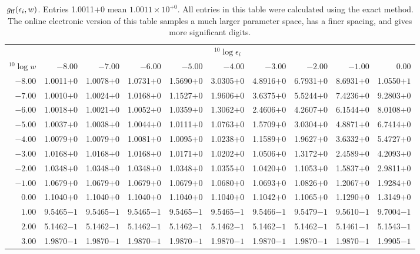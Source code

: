 \documentclass[useAMS,usenatbib]{mn2e}
\begin{document}
\begin{table}
\caption{$g_{\rm ff}(\epsilon_i,w)$. Entries 1.0011$+0$ mean $1.0011 \times
  10^{+0}$. All entries in this table were calculated using the exact method.
  The online electronic version of this table samples a much larger parameter
  space, has a finer spacing, and gives more significant digits.\label{nonav}}
\begin{tabular}{rrrrrrrrrr}
\hline
   & \multicolumn{9}{c}{${}^{10}\log \epsilon_i$} \\
${}^{10}\log w$ & $-8.00$ & $-7.00$ &   $-6.00$ &    $-5.00$ &    $-4.00$ &    $-3.00$ &    $-2.00$ &    $-1.00$ &       0.00 \\
\hline
$-8.00$ & 1.0011$+0$ & 1.0078$+0$ & 1.0731$+0$ & 1.5690$+0$ & 3.0305$+0$ & 4.8916$+0$ & 6.7931$+0$ & 8.6931$+0$ & 1.0550$+1$ \\
$-7.00$ & 1.0010$+0$ & 1.0024$+0$ & 1.0168$+0$ & 1.1527$+0$ & 1.9606$+0$ & 3.6375$+0$ & 5.5244$+0$ & 7.4236$+0$ & 9.2803$+0$ \\
$-6.00$ & 1.0018$+0$ & 1.0021$+0$ & 1.0052$+0$ & 1.0359$+0$ & 1.3062$+0$ & 2.4606$+0$ & 4.2607$+0$ & 6.1544$+0$ & 8.0108$+0$ \\
$-5.00$ & 1.0037$+0$ & 1.0038$+0$ & 1.0044$+0$ & 1.0111$+0$ & 1.0763$+0$ & 1.5709$+0$ & 3.0304$+0$ & 4.8871$+0$ & 6.7414$+0$ \\
$-4.00$ & 1.0079$+0$ & 1.0079$+0$ & 1.0081$+0$ & 1.0095$+0$ & 1.0238$+0$ & 1.1589$+0$ & 1.9627$+0$ & 3.6332$+0$ & 5.4727$+0$ \\
$-3.00$ & 1.0168$+0$ & 1.0168$+0$ & 1.0168$+0$ & 1.0171$+0$ & 1.0202$+0$ & 1.0506$+0$ & 1.3172$+0$ & 2.4589$+0$ & 4.2093$+0$ \\
$-2.00$ & 1.0348$+0$ & 1.0348$+0$ & 1.0348$+0$ & 1.0348$+0$ & 1.0355$+0$ & 1.0420$+0$ & 1.1053$+0$ & 1.5837$+0$ & 2.9811$+0$ \\
$-1.00$ & 1.0679$+0$ & 1.0679$+0$ & 1.0679$+0$ & 1.0679$+0$ & 1.0680$+0$ & 1.0693$+0$ & 1.0826$+0$ & 1.2067$+0$ & 1.9284$+0$ \\
$ 0.00$ & 1.1040$+0$ & 1.1040$+0$ & 1.1040$+0$ & 1.1040$+0$ & 1.1040$+0$ & 1.1042$+0$ & 1.1065$+0$ & 1.1290$+0$ & 1.3149$+0$ \\
$ 1.00$ & 9.5465$-1$ & 9.5465$-1$ & 9.5465$-1$ & 9.5465$-1$ & 9.5465$-1$ & 9.5466$-1$ & 9.5479$-1$ & 9.5610$-1$ & 9.7004$-1$ \\
$ 2.00$ & 5.1462$-1$ & 5.1462$-1$ & 5.1462$-1$ & 5.1462$-1$ & 5.1462$-1$ & 5.1462$-1$ & 5.1462$-1$ & 5.1461$-1$ & 5.1543$-1$ \\
$ 3.00$ & 1.9870$-1$ & 1.9870$-1$ & 1.9870$-1$ & 1.9870$-1$ & 1.9870$-1$ & 1.9870$-1$ & 1.9870$-1$ & 1.9870$-1$ & 1.9905$-1$ \\

\end{tabular}
\end{table}
\end{document}
